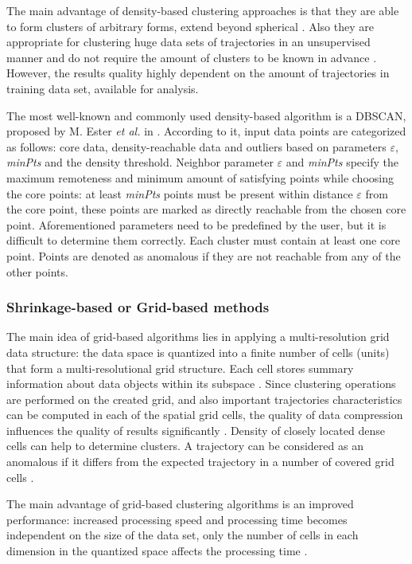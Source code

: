 The main advantage of density-based clustering approaches is that they are able to form clusters of arbitrary forms, extend beyond spherical \cite{article:8_review_mot_cl_alg}. Also they are appropriate for clustering huge data sets of trajectories in an unsupervised manner and do not require the amount of clusters to be known in advance \cite{article:5_survey_tbsa}\cite{article:22_survey_dscc}. However, the results quality highly dependent on the amount of trajectories in training data set, available for analysis.

The most well-known and commonly used density-based algorithm is a DBSCAN, proposed by M. Ester \textit{et al.} in \cite{inproceedings:20_dbscan}. According to it, input data points are categorized as follows: core data, density-reachable data and outliers based on parameters $\varepsilon$, \textit{minPts} and the density threshold. Neighbor parameter $\varepsilon$ and \textit{minPts} specify the maximum remoteness and minimum amount of satisfying points while choosing the core points: at least \textit{minPts} points must be present within distance $\varepsilon$ from the core point, these points are marked as directly reachable from the chosen core point. Aforementioned parameters need to be predefined by the user, but it is difficult to determine them correctly. Each cluster must contain at least one core point. Points are denoted as anomalous if they are not reachable from any of the other points.

\subsubsection{Shrinkage-based or Grid-based methods}
The main idea of grid-based algorithms lies in applying a multi-resolution grid data structure: the data space is quantized into a finite number of cells (units) that form a multi-resolutional grid structure. Each cell stores summary information about data objects within its subspace \cite{article:22_survey_dscc}. Since clustering operations are performed on the created grid, and also important trajectories characteristics can be computed in each of the spatial grid cells, the quality of data compression influences the quality of results significantly \cite{article:1_survey_stdm}. Density of closely located dense cells can help to determine clusters. A trajectory can be considered as an anomalous if it differs from the expected trajectory in a number of covered grid cells \cite{article:22_survey_dscc}.

The main advantage of grid-based clustering algorithms is an improved performance: increased processing speed and processing time becomes independent on the size of the data set, only the number of cells in each dimension in the quantized space affects the processing time \cite{article:8_review_mot_cl_alg}.

